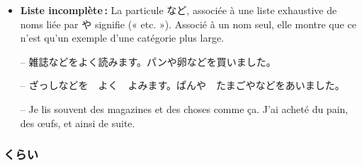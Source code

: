     \begin{itemize}
        \item \textbf{Liste incomplète :} La particule など, associée à une liste exhaustive de noms liée par や signifie (« etc. »). Associé à un nom seul, elle montre que ce n'est qu'un exemple d'une catégorie plus large.
        
        \begin{tcolorbox}
            -- 雑誌などをよく読みます。パンや卵などを買いました。

            -- ざっしなどを　よく　よみます。ぱんや　たまごやなどをあいました。

            -- Je lis souvent des magazines et des choses comme ça. J'ai acheté du pain, des œufs, et ainsi de suite.
        \end{tcolorbox}
    \end{itemize}

        \subsubsection{くらい}

